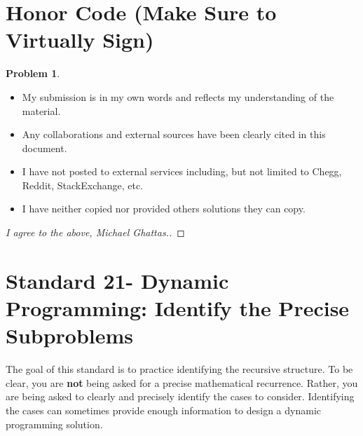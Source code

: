 \documentclass[11pt]{article}
\theoremstyle{definition}
\theoremstyle{definition}
\newtheorem{required}{Problem}
\theoremstyle{definition}
\begin{document}
\section{Honor Code (Make Sure to Virtually Sign)} \label{HonorCode}

\begin{required}
\begin{itemize}
\item My submission is in my own words and reflects my understanding of the material.
\item Any collaborations and external sources have been clearly cited in this document.
\item I have not posted to external services including, but not limited to Chegg, Reddit, StackExchange, etc.
\item I have neither copied nor provided others solutions they can copy.
\end{itemize}

\end{required}

\begin{proof}[I agree to the above, Michael Ghattas.]
\end{proof}


\newpage
\section{Standard 21- Dynamic Programming: Identify the Precise Subproblems}

\noindent The goal of this standard is to practice identifying the recursive structure. To be clear, you are \textbf{not} being asked for a precise mathematical recurrence. Rather, you are being asked to clearly and precisely identify the cases to consider. Identifying the cases can sometimes provide enough information to design a dynamic programming solution.
\end{document}

